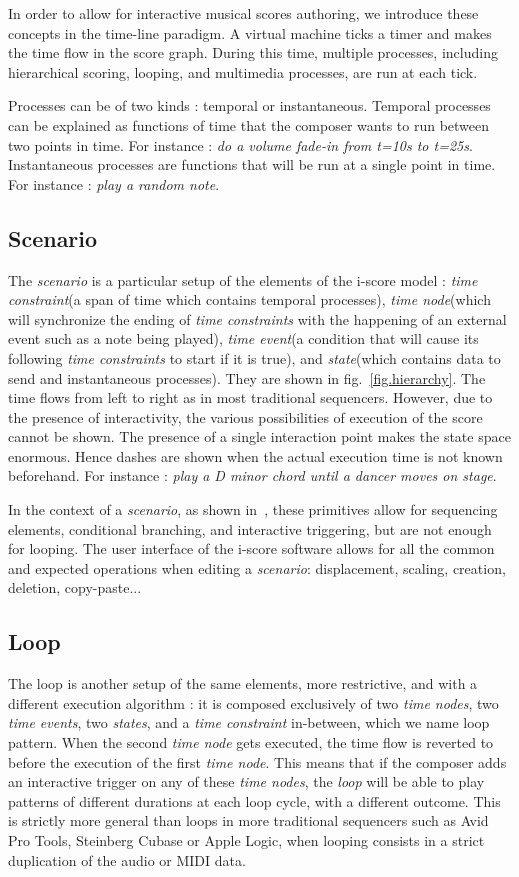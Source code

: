\documentclass{article}
\newcommand{\scenario}{\textit{scenario}\xspace}
\newcommand{\Loop}{\textit{loop}\xspace}
\newcommand{\state}{\textit{state}\xspace}
\newcommand{\states}{\textit{states}\xspace}
\newcommand{\timeevent}{\textit{time event}\xspace}
\newcommand{\timeevents}{\textit{time events}\xspace}
\newcommand{\timenode}{\textit{time node}\xspace}
\newcommand{\timenodes}{\textit{time nodes}\xspace}
\newcommand{\timeconstraint}{\textit{time constraint}\xspace}
\newcommand{\timeconstraints}{\textit{time constraints}\xspace}
\begin{document}
In order to allow for interactive musical scores authoring, we introduce these concepts in the time-line paradigm.
A virtual machine ticks a timer and makes the time flow in the score graph. 
During this time, multiple processes, including hierarchical scoring, looping, and multimedia processes, are 
run at each tick. 

Processes can be of two kinds : temporal or instantaneous.
Temporal processes can be explained as functions of time that the composer wants to run between 
two points in time. 
For instance : \emph{do a volume fade-in from t=10s to t=25s}.~\\
Instantaneous processes are functions that will be run at a single point in time.
For instance : \emph{play a random note}.

\subsection{Scenario}
The \scenario is a particular setup of the elements of the i-score model : \timeconstraint (a span of time which contains temporal processes), \timenode (which will synchronize the ending of \timeconstraints with the happening of an external event such as a note being played), \timeevent (a condition that will cause its following \timeconstraints to start if it is true), and \state (which contains data to send and instantaneous processes).
They are shown in fig.~\ref{fig.hierarchy}. 
The time flows from left to right as in most traditional sequencers. 
However, due to the presence of interactivity, the various possibilities of execution of the score cannot be shown. 
The presence of a single interaction point makes the state space enormous.
Hence dashes are shown when the actual execution time is not known beforehand. 
For instance : \emph{play a D minor chord until a dancer moves on stage}.

In the context of a \scenario, as shown in~\cite{celerier2015ossia}, these primitives allow for sequencing elements, conditional branching, and interactive triggering, but are not enough for looping.
The user interface of the i-score software allows for all the common and expected operations when editing a \scenario : displacement, scaling, creation, deletion, copy-paste...

\subsection{Loop}
The loop is another setup of the same elements, more restrictive, and with a different execution algorithm : it is 
composed exclusively of two \timenodes, two \timeevents, two \states, and a \timeconstraint in-between, which we name loop pattern.
When the second \timenode gets executed, the time flow is reverted to before the execution of the first \timenode.
This means that if the composer adds an interactive trigger on any of these \timenodes, the \Loop will be able to play patterns of different durations at each loop cycle, with a different outcome.
This is strictly more general than loops in more traditional sequencers such as Avid Pro Tools, Steinberg Cubase or Apple Logic, when looping consists in a strict duplication of the audio or MIDI data.
\end{document}
